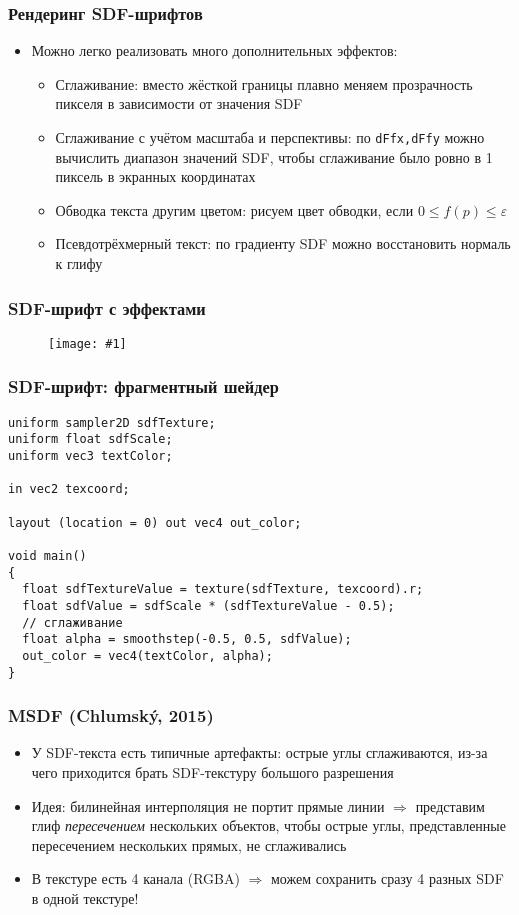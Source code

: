 \documentclass{beamer}
\newcommand{\slideimage}[1]{
  \begin{figure}
    \begin{adjustbox}{width=\textwidth, totalheight=\textheight-2\baselineskip-2\baselineskip,keepaspectratio}
      \texttt{[image: \#1]}
    \end{adjustbox}
  \end{figure}
}
\begin{document}
\begin{frame}[fragile]
\frametitle{Рендеринг SDF-шрифтов}
\begin{itemize}
\item Можно легко реализовать много дополнительных эффектов:
\pause
\begin{itemize}
\item Сглаживание: вместо жёсткой границы плавно меняем прозрачность пикселя в зависимости от значения SDF
\pause
\item Сглаживание с учётом масштаба и перспективы: по \verb|dFfx,dFfy| можно вычислить диапазон значений SDF, чтобы сглаживание было ровно в 1 пиксель в экранных координатах
\pause
\item Обводка текста другим цветом: рисуем цвет обводки, если \begin{math}0 \leq f(p) \leq \varepsilon\end{math}
\pause
\item Псевдотрёхмерный текст: по градиенту SDF можно восстановить нормаль к глифу
\end{itemize}
\end{itemize}
\end{frame}

\begin{frame}[fragile]
\frametitle{SDF-шрифт с эффектами}
\slideimage{sdf-effects.png}
\end{frame}

\begin{frame}[fragile]
\frametitle{SDF-шрифт: фрагментный шейдер}
\fontsize{10pt}{10pt}
\begin{verbatim}
uniform sampler2D sdfTexture;
uniform float sdfScale;
uniform vec3 textColor;

in vec2 texcoord;

layout (location = 0) out vec4 out_color;

void main()
{
  float sdfTextureValue = texture(sdfTexture, texcoord).r;
  float sdfValue = sdfScale * (sdfTextureValue - 0.5);
  // сглаживание
  float alpha = smoothstep(-0.5, 0.5, sdfValue);
  out_color = vec4(textColor, alpha);
}
\end{verbatim}
\end{frame}

\begin{frame}[fragile]
\frametitle{MSDF (Chlumský, 2015)}
\begin{itemize}
\item У SDF-текста есть типичные артефакты: острые углы сглаживаются, из-за чего приходится брать SDF-текстуру большого разрешения
\pause
\item Идея: билинейная интерполяция не портит прямые линии \begin{math}\Rightarrow\end{math} представим глиф \textit{пересечением} нескольких объектов, чтобы острые углы, представленные пересечением нескольких прямых, не сглаживались
\pause
\item В текстуре есть 4 канала (RGBA) \begin{math}\Rightarrow\end{math} можем сохранить сразу 4 разных SDF в одной текстуре!
\end{itemize}
\end{frame}
\end{document}
